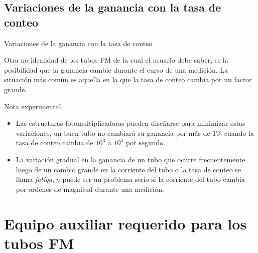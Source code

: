 \documentclass[a4paper,10pt]{beamer}
\begin{document}
\subsection{Variaciones de la ganancia con la tasa de conteo}
\begin{frame}{Variaciones de la ganancia con la tasa de conteo}
 
 \begin{justify}
 Otra no-idealidad de los tubos FM de la cual el usuario debe saber, es la posibilidad 
 que la ganancia cambie durante el curso de una medición. La situación más común es 
 aquella en la que la tasa de conteo cambia por un factor grande. 
 
 \begin{exampleblock}{Nota experimental}
 \begin{itemize}[<+->]
  \item  \begin{justify}
	Las estructuras fotomultiplicadoras pueden diseñarse para minimizar estas variaciones, 
	un buen tubo no cambiará su ganancia por más de 1\% cuando la tasa de conteo cambia 
	de $10^3$ a $10^4$ por segundo.
	 \end{justify}
  \item  \begin{justify}
	 La variación gradual en la ganancia de un tubo que ocurre frecuentemente luego de 
	 un cambio grande en la corriente del tubo o la tasa de conteo se llama \emph{fatiga},
	 y puede ser un problema serio si la corriente del tubo cambia por ordenes de 
	 magnitud durante una medición.
	 \end{justify}
 \end{itemize}
 \end{exampleblock}
 
\end{justify} 
\end{frame}

\section{Equipo auxiliar requerido para los tubos FM}
\end{document}

